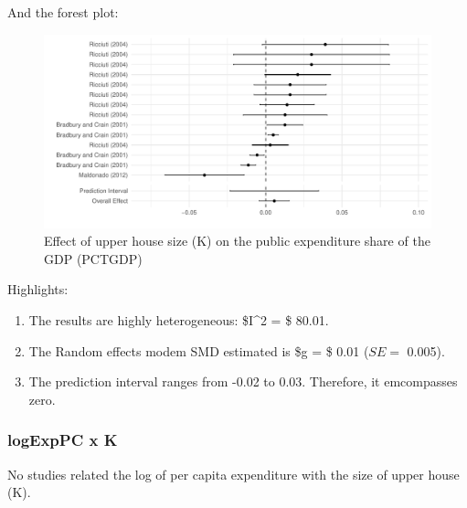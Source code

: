 \documentclass[
]{article}
\providecommand{\tightlist}{%
  \setlength{\itemsep}{0pt}\setlength{\parskip}{0pt}}
\begin{document}
And the forest plot:

\begin{figure}
\centering
\includegraphics{appendixV5_files/figure-latex/unnamed-chunk-45-1.pdf}
\caption{Effect of upper house size (K) on the public expenditure share
of the GDP (PCTGDP)}
\end{figure}

Highlights:

\begin{enumerate}
\def\labelenumi{\arabic{enumi}.}
\tightlist
\item
  The results are highly heterogeneous: \$I\^{}2 = \$ 80.01.
\item
  The Random effects modem SMD estimated is \$g = \$ 0.01 (\(SE =\)
  0.005).
\item
  The prediction interval ranges from -0.02 to 0.03. Therefore, it
  emcompasses zero.
\end{enumerate}

\hypertarget{logexppc-x-k-1}{%
\subsubsection{logExpPC x K}\label{logexppc-x-k-1}}

No studies related the log of per capita expenditure with the size of
upper house (K).
\end{document}

